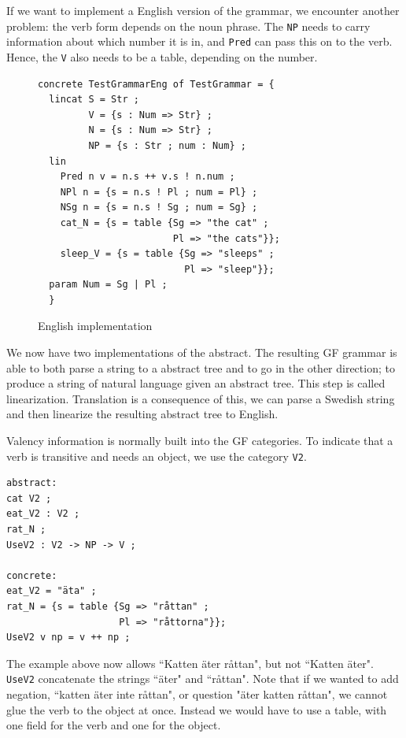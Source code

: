 \documentclass{report}
\begin{document}
If we want to implement a English version of the grammar, we encounter another
problem: the verb form depends on the noun phrase. The \verb|NP| needs to carry
information about which number it is in, and \verb|Pred| can pass this on to the
verb. Hence, the \verb|V| also needs to be a table, depending on the number.
\begin{figure}[h!]
\begin{verbatim}              
concrete TestGrammarEng of TestGrammar = {
  lincat S = Str ;
         V = {s : Num => Str} ;
         N = {s : Num => Str} ;
         NP = {s : Str ; num : Num} ;
  lin   
    Pred n v = n.s ++ v.s ! n.num ;
    NPl n = {s = n.s ! Pl ; num = Pl} ;
    NSg n = {s = n.s ! Sg ; num = Sg} ;
    cat_N = {s = table {Sg => "the cat" ;
                        Pl => "the cats"}};
    sleep_V = {s = table {Sg => "sleeps" ; 
                          Pl => "sleep"}};
  param Num = Sg | Pl ;
  }
\end{verbatim}           
\caption{English implementation}
\label{fig:gfTestEng}
\end{figure}


We now have two implementations of the abstract. The resulting GF grammar is able to
both parse a string to a abstract tree and to go in the other direction; to produce
a string of natural language given an abstract tree. This step is called linearization.
Translation is a consequence of this, we can parse a Swedish string and then 
linearize the resulting abstract tree to English. 

Valency information is normally built into the GF categories. To indicate that
a verb is transitive and needs an object, we use the category \verb_V2_.
\begin{verbatim}
abstract:
cat V2 ; 
eat_V2 : V2 ;
rat_N ;
UseV2 : V2 -> NP -> V ;

concrete:
eat_V2 = "äta" ;
rat_N = {s = table {Sg => "råttan" ;
                    Pl => "råttorna"}};
UseV2 v np = v ++ np ;
\end{verbatim}

The example above now allows ``Katten äter råttan", but not ``Katten äter".
\verb|UseV2| concatenate the strings ``äter" and ``råttan". Note that if we
wanted to add negation, ``katten äter inte råttan", or question "äter katten råttan",
we cannot glue the verb to the object at once. Instead we would have to use a table,
with one field for the verb and one for the object. 
\end{document}
